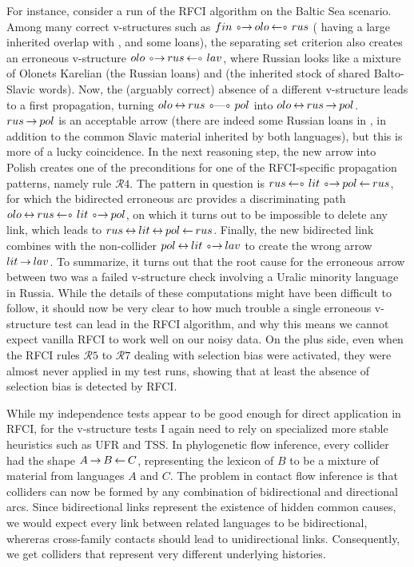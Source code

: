 For instance, consider a run of the RFCI algorithm on the Baltic Sea scenario. Among many correct v-structures such as $fin \arrowOA olo \arrowAO rus$ ( having a large inherited overlap with , and some  loans), the separating set criterion also creates an erroneous v-structure $olo \arrowOA rus \arrowAO lav$, where Russian looks like a mixture of Olonets Karelian (the Russian loans) and  (the inherited stock of shared Balto-Slavic words). Now, the (arguably correct) absence of a different v-structure leads to a first propagation, turning $olo \arrowAA rus \arrowOO pol$ into $olo \arrowAA rus \arrowLA pol$. $rus \arrowLA pol$ is an acceptable arrow (there are indeed some Russian loans in , in addition to the common Slavic material inherited by both languages), but this is more of a lucky coincidence. In the next reasoning step, the new arrow into Polish creates one of the preconditions for one of the RFCI-specific propagation patterns, namely rule $\mathcal{R}4$. The pattern in question is $rus \arrowAO lit \arrowOA pol \arrowAL rus$, for which the bidirected erroneous arc provides a discriminating path $olo \arrowAA rus \arrowAO lit \arrowOA pol$, on which it turns out to be impossible to delete any link, which leads to $rus \arrowAA lit \arrowAA pol \arrowAL rus$. Finally, the new bidirected link combines with the non-collider $pol \arrowAA lit \arrowOA lav$ to create the wrong arrow $lit \arrowLA lav$. To summarize, it turns out that the root cause for the erroneous arrow between two  was a failed v-structure check involving a Uralic minority language in Russia. While the details of these computations might have been difficult to follow, it should now be very clear to how much trouble a single erroneous v-structure test can lead in the RFCI algorithm, and why this means we cannot expect vanilla RFCI to work well on our noisy data. On the plus side, even when the RFCI rules $\mathcal{R}5$ to $\mathcal{R}7$ dealing 
with selection bias were activated, they were almost never applied in my test runs, showing that at least the absence of selection bias is detected by RFCI.

While my independence tests appear to be good enough for direct application in RFCI, for the v-structure tests I again need to rely on specialized more stable heuristics such as UFR and TSS. In phylogenetic flow inference, every collider had the shape $A \arrowLA B \arrowAL C$, representing the lexicon of $B$ to be a mixture of material from languages $A$ and $C$. The problem in contact flow inference is that colliders can now be formed by any combination of bidirectional and directional arcs. Since bidirectional links represent the existence of hidden common causes, we would expect every link between related languages to be bidirectional, whereras cross-family contacts should lead to unidirectional links. Consequently, we get colliders that represent very different underlying histories.

